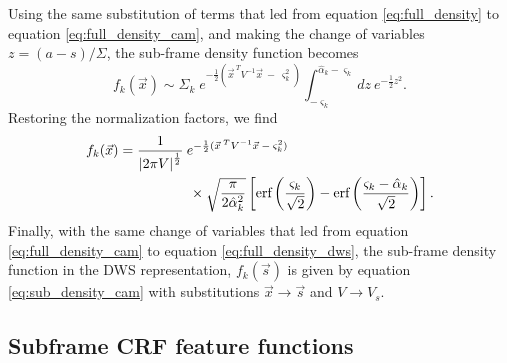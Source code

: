 \documentclass[10pt]{article}
\newcommand{\half}{\frac{1}{2}}
\newcommand{\pvecT}{\vec{p}_k^{\;T}}
\newcommand{\erf}{\mbox{erf}}
\newcommand{\dws}{{\small DWS}}
\begin{document}
%
Using the same substitution of terms that led from equation \eqref{eq:full_density} to equation \eqref{eq:full_density_cam}, and making the change of variables $z = (a-s)/\Sigma$,  the sub-frame density function becomes
\begin{equation}
\label{eq:sub_density_2}
f_k(\vec{x}) \sim \Sigma_k \; e^{-\half (\vec{x}^{\:T} V^{-1}\vec{x} \:-\: \varsigma_k^2)} \int_{-\varsigma_k}^{\hat{\alpha}_k-\varsigma_k}{dz\: e^{-\half z^2}}. 
\end{equation}
Restoring the normalization factors, we find
\begin{equation}
\label{eq:sub_density_cam}
\begin{split}
f_k(\vec{x})& = \frac{1}{\left| 2\pi V \right|^\half} \: e^{-\half (\vec{x}^{\:T} V^{-1}\vec{x} \:-\: \varsigma_k^2)} \\
						& \hspace{.7in}\times \sqrt{\frac{\pi}{2\hat{\alpha}_k^2}} \left[ \erf \left( \frac{\varsigma_k}{\sqrt{2}}\right) - \erf \left( \frac{\varsigma_k - \hat{\alpha}_k}{\sqrt{2}} \right)\right].
\end{split}
\end{equation}
Finally, with the same change of variables that led from equation \eqref{eq:full_density_cam} to equation \eqref{eq:full_density_dws}, the sub-frame density function in the \dws{} representation, $f_k(\vec{s})$ is given by equation \eqref{eq:sub_density_cam} with substitutions $\vec{x} \rightarrow \vec{s}$ and $V \rightarrow V_s$.

\subsection{Subframe CRF feature functions}
\label{sec:feature_functions}
\end{document}
